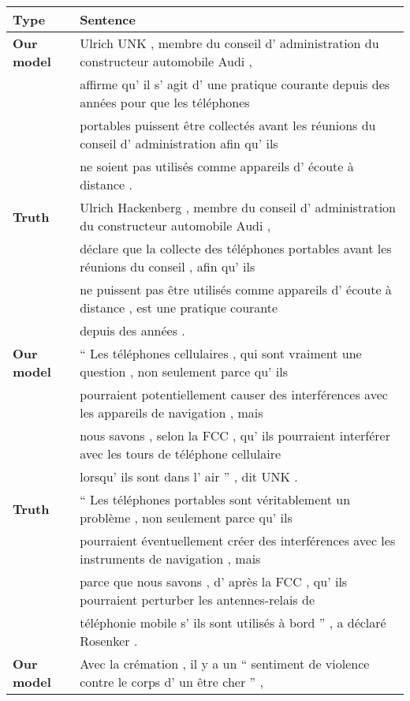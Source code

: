 \documentclass{article} \usepackage{nips14submit_e}
\begin{document}
\begin{table}[ht!]
\centering
\begin{footnotesize}
\begin{tabular}{|l|l|}
\hline
{\bf  Type} & {\bf Sentence} \\ 
\hline
\hline
{\bf Our model} & Ulrich UNK , membre du conseil d' administration du constructeur automobile Audi , \\
& affirme qu' il s' agit d' une pratique courante depuis des ann\'{e}es pour que les t\'{e}l\'{e}phones \\
& portables  puissent  \^{e}tre collect\'{e}s avant les r\'{e}unions du conseil d' administration afin qu' ils\\
&  ne soient pas  utilis\'{e}s comme appareils d' \'{e}coute \`{a} distance .\\
\hline
{\bf  Truth} &  Ulrich Hackenberg , membre du conseil d' administration du constructeur automobile Audi ,   \\
& d\'{e}clare que la collecte des t\'{e}l\'{e}phones portables avant les r\'{e}unions du conseil , afin qu' ils  \\
& ne puissent pas \^{e}tre utilis\'{e}s comme appareils d' \'{e}coute \`{a} distance , est une pratique courante \\ 
& depuis des ann\'{e}es .\\
\hline\hline
{\bf Our model} & 
`` Les t\'{e}l\'{e}phones cellulaires , qui sont vraiment une question , non seulement parce qu' ils \\
& pourraient potentiellement causer des interf\'{e}rences avec les appareils de navigation , mais \\
& nous savons , selon la FCC , qu' ils pourraient interf\'{e}rer avec les tours de t\'{e}l\'{e}phone cellulaire \\
& lorsqu' ils sont dans l' air '' , dit UNK .\\
\hline
{\bf Truth} & 
`` Les t\'{e}l\'{e}phones portables sont v\'{e}ritablement un probl\`{e}me , non seulement parce qu' ils \\
& pourraient \'{e}ventuellement cr\'{e}er des interf\'{e}rences avec les instruments de navigation , mais \\
& parce que nous savons , d' apr\`{e}s la FCC , qu' ils pourraient perturber les antennes-relais de \\
& t\'{e}l\'{e}phonie mobile s' ils sont utilis\'{e}s \`{a} bord '' , a d\'{e}clar\'{e} Rosenker .\\
\hline\hline
{\bf Our model} & 
Avec la cr\'{e}mation , il y a un `` sentiment de violence contre le corps d' un \^{e}tre cher '' , \\

\end{tabular}
\end{footnotesize}
\end{table}
\end{document}
